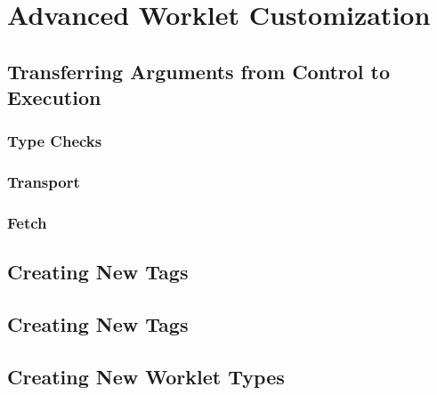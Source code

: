 
\chapter{Advanced Worklet Customization}
\label{chap:AdvancedWorklets}

\section{Transferring Arguments from Control to Execution}
\label{sec:TransferringArguments}

\subsection{Type Checks}
\label{sec:TypeChecks}




\subsection{Transport}
\label{sec:Transport}




\subsection{Fetch}
\label{sec:Fetch}






\section{Creating New \protect\controlsignature Tags}
\label{sec:NewControlSignatureTags}


\section{Creating New \protect\executionsignature Tags}
\label{sec:NewExecutionSignatureTags}


\section{Creating New Worklet Types}
\label{sec:NewWorkletTypes}
